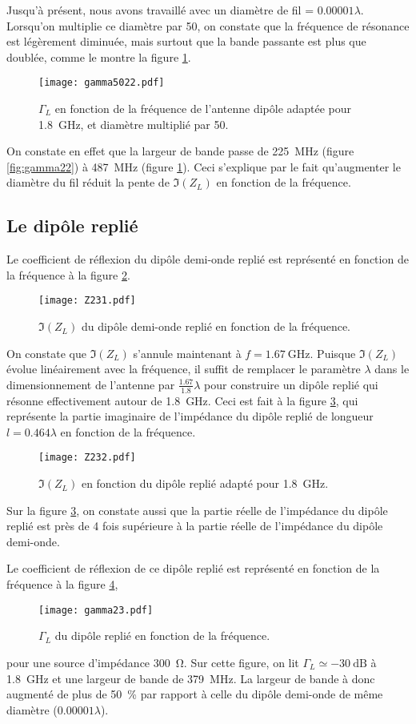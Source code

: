 Jusqu'à présent, nous avons travaillé avec un diamètre de fil = $0.00001 \lambda$. Lorsqu'on multiplie ce diamètre par 50, on constate que la fréquence de résonance est légèrement diminuée, mais surtout que la bande passante est plus que doublée, comme le montre la figure \ref{fig:gamma5022}.
\begin{figure}[htbp]
  \centering
  \texttt{[image: gamma5022.pdf]}
  \caption{$\Gamma_L$  en fonction de la fréquence de l'antenne dipôle adaptée pour \SI{1.8}{\giga\hertz}, et diamètre multiplié par 50.\label{fig:gamma5022}}
\end{figure}
On constate en effet que la largeur de bande passe de \SI{225}{\mega\hertz} (figure \ref{fig:gamma22}) à \SI{487}{\mega\hertz} (figure \ref{fig:gamma5022}). Ceci s'explique par le fait qu'augmenter le diamètre du fil réduit la pente de $\Im(Z_L)$ en fonction de la fréquence.

\subsection{Le dipôle replié}
Le coefficient de réflexion du dipôle demi-onde replié est représenté en fonction de la fréquence à la figure \ref{fig:Z231}.

\begin{figure}[htbp]
  \centering
  \texttt{[image: Z231.pdf]}
  \caption{$\Im(Z_L)$ du dipôle demi-onde replié en fonction de la fréquence.\label{fig:Z231}}
\end{figure}
On constate que $\Im(Z_L)$ s'annule maintenant à $f = \SI{1.67}{\giga\hertz}$. Puisque $\Im(Z_L)$ évolue linéairement avec la fréquence, il suffit de remplacer le paramètre $\lambda$ dans le dimensionnement de l'antenne par $\frac{1.67}{1.8}\lambda$ pour construire un dipôle replié qui résonne effectivement autour de \SI{1.8}{\giga\hertz}. Ceci est fait à la figure \ref{fig:Z232}, qui représente la partie imaginaire de l'impédance du dipôle replié de longueur $l = 0.464 \lambda$ en fonction de la fréquence.
\begin{figure}[htbp]
  \centering
  \texttt{[image: Z232.pdf]}
  \caption{$\Im(Z_L)$ en fonction du dipôle replié adapté pour \SI{1.8}{\giga\hertz}.\label{fig:Z232}}
\end{figure}
Sur la figure \ref{fig:Z232}, on constate aussi que la partie réelle de l'impédance du dipôle replié est près de 4 fois supérieure à la partie réelle de l'impédance du dipôle demi-onde.

Le coefficient de réflexion de ce dipôle replié est représenté en fonction de la fréquence à la figure \ref{fig:gamma23},
\begin{figure}[htbp]
  \centering
  \texttt{[image: gamma23.pdf]}
  \caption{$\Gamma_L$ du dipôle replié en fonction de la fréquence.\label{fig:gamma23}}
\end{figure}
pour une source d'impédance \SI{300}{\ohm}. Sur cette figure, on lit $\Gamma_L \simeq \SI{-30}{\deci\bel}$ à \SI{1.8}{\giga\hertz} et une largeur de bande de \SI{379}{\mega\hertz}. La largeur de bande à donc augmenté de plus de \SI{50}{\percent} par rapport à celle du dipôle demi-onde de même diamètre ($0.00001\lambda$).

